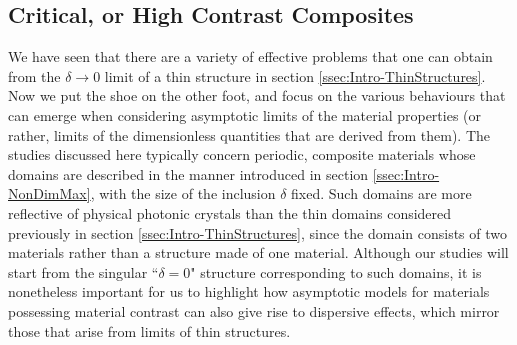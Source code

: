 \subsection{Critical, or High Contrast Composites} \label{ssec:Intro-CritContrast}
We have seen that there are a variety of effective problems that one can obtain from the $\delta\rightarrow0$ limit of a thin structure in section \ref{ssec:Intro-ThinStructures}.
Now we put the shoe on the other foot, and focus on the various behaviours that can emerge when considering asymptotic limits of the material properties (or rather, limits of the dimensionless quantities that are derived from them).
The studies discussed here typically concern periodic, composite materials whose domains are described in the manner introduced in section \ref{ssec:Intro-NonDimMax}, with the size of the inclusion $\delta$ fixed.
Such domains are more reflective of physical photonic crystals than the thin domains considered previously in section \ref{ssec:Intro-ThinStructures}, since the domain consists of two materials rather than a structure made of one material.
Although our studies will start from the singular ``$\delta=0$" structure corresponding to such domains, it is nonetheless important for us to highlight how asymptotic models for materials possessing material contrast can also give rise to dispersive effects, which mirror those that arise from limits of thin structures.

